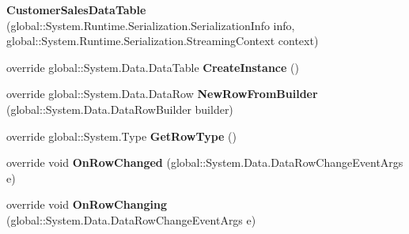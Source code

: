 \begin{DoxyCompactItemize}
\item 
{\bfseries Customer\+Sales\+Data\+Table} (global\+::\+System.\+Runtime.\+Serialization.\+Serialization\+Info info, global\+::\+System.\+Runtime.\+Serialization.\+Streaming\+Context context)\hypertarget{class_products_1_1_data_1_1ds_sage_1_1_customer_sales_data_table_a03fbd56f47344ee4581e9a69a44116f2}{}\label{class_products_1_1_data_1_1ds_sage_1_1_customer_sales_data_table_a03fbd56f47344ee4581e9a69a44116f2}

\item 
override global\+::\+System.\+Data.\+Data\+Table {\bfseries Create\+Instance} ()\hypertarget{class_products_1_1_data_1_1ds_sage_1_1_customer_sales_data_table_a219e208039d2915b2607a2ab05b017e7}{}\label{class_products_1_1_data_1_1ds_sage_1_1_customer_sales_data_table_a219e208039d2915b2607a2ab05b017e7}

\item 
override global\+::\+System.\+Data.\+Data\+Row {\bfseries New\+Row\+From\+Builder} (global\+::\+System.\+Data.\+Data\+Row\+Builder builder)\hypertarget{class_products_1_1_data_1_1ds_sage_1_1_customer_sales_data_table_a5f306856b3270444790fe07fbee17a83}{}\label{class_products_1_1_data_1_1ds_sage_1_1_customer_sales_data_table_a5f306856b3270444790fe07fbee17a83}

\item 
override global\+::\+System.\+Type {\bfseries Get\+Row\+Type} ()\hypertarget{class_products_1_1_data_1_1ds_sage_1_1_customer_sales_data_table_aeae66d8159da0f621a2f0276311f32c2}{}\label{class_products_1_1_data_1_1ds_sage_1_1_customer_sales_data_table_aeae66d8159da0f621a2f0276311f32c2}

\item 
override void {\bfseries On\+Row\+Changed} (global\+::\+System.\+Data.\+Data\+Row\+Change\+Event\+Args e)\hypertarget{class_products_1_1_data_1_1ds_sage_1_1_customer_sales_data_table_a138c03ccadba458c828c37c5ae7a48d9}{}\label{class_products_1_1_data_1_1ds_sage_1_1_customer_sales_data_table_a138c03ccadba458c828c37c5ae7a48d9}

\item 
override void {\bfseries On\+Row\+Changing} (global\+::\+System.\+Data.\+Data\+Row\+Change\+Event\+Args e)\hypertarget{class_products_1_1_data_1_1ds_sage_1_1_customer_sales_data_table_acbc0b0a0999ba9314d58a17655f795b1}{}\label{class_products_1_1_data_1_1ds_sage_1_1_customer_sales_data_table_acbc0b0a0999ba9314d58a17655f795b1}


\end{DoxyCompactItemize}
